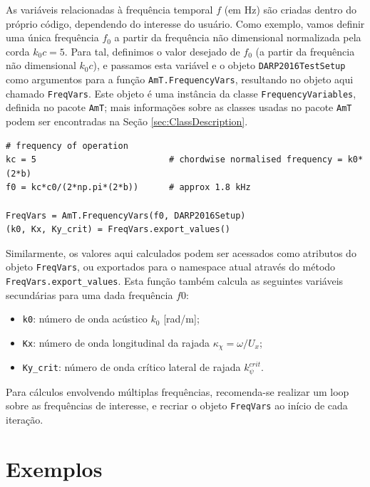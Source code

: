 \documentclass[a4paper, 11pt, twoside]{article}
\newcommand{\AmT}{\texttt{AmT}}
\begin{document}
As variáveis relacionadas à frequência temporal $f$ (em Hz) são criadas dentro do próprio código, dependendo do interesse do usuário. Como exemplo, vamos definir uma única frequência $f_0$ a partir da frequência não dimensional normalizada pela corda $k_0 c = 5$. Para tal, definimos o valor desejado de $f_0$ (a partir da frequência não dimensional $k_0 c$), e passamos esta variável e o objeto \verb|DARP2016TestSetup| como argumentos para a função \verb|AmT.FrequencyVars|, resultando no objeto aqui chamado \verb|FreqVars|. Este objeto é uma instância da classe \verb|FrequencyVariables|, definida no pacote \AmT{}; mais informações sobre as classes usadas no pacote \AmT{} podem ser encontradas na Seção \ref{sec:ClassDescription}. 

\begin{lstlisting}[caption={Criando variáveis relacionadas à frequência},label={lst:FrequencyVars}]
# frequency of operation
kc = 5                          # chordwise normalised frequency = k0*(2*b)
f0 = kc*c0/(2*np.pi*(2*b))      # approx 1.8 kHz

FreqVars = AmT.FrequencyVars(f0, DARP2016Setup)
(k0, Kx, Ky_crit) = FreqVars.export_values()
\end{lstlisting}

Similarmente, os valores aqui calculados podem ser acessados como atributos do objeto \verb|FreqVars|, ou exportados para o namespace atual através do método \verb|FreqVars.export_values|. Esta função também calcula as seguintes variáveis secundárias para uma dada frequência $f0$:

\begin{itemize}
	\item \verb|k0|: número de onda acústico $k_0$ [rad/m];
	\item \verb|Kx|: número de onda longitudinal da rajada $\kappa_\chi = \omega/U_x$;
	\item \verb|Ky_crit|: número de onda crítico lateral de rajada $k_\psi^{crit}$.
\end{itemize}

Para cálculos envolvendo múltiplas frequências, recomenda-se realizar um loop sobre as frequências de interesse, e recriar o objeto \verb|FreqVars| ao início de cada iteração.

\newpage
\section{Exemplos}
\end{document}
